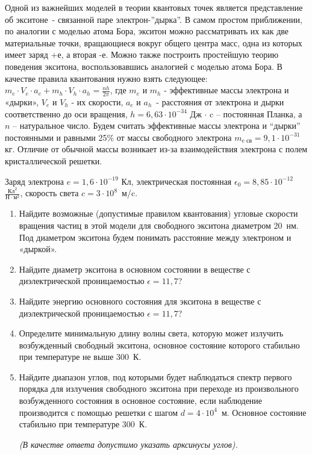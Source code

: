
Одной из важнейших моделей в теории квантовых точек является представление об экситоне~- 
связанной паре электрон-”дырка”. В самом простом приближении, по аналогии с моделью атома Бора, 
экситон можно рассматривать их как две материальные точки, вращающиеся вокруг общего центра масс, 
одна из которых имеет заряд +е, а вторая -е. Можно также построить простейшую теорию поведения экситона, 
воспользовавшись аналогией с моделью атома Бора. В качестве правила квантования нужно взять следующее: 
${m_e \cdot V_e \cdot a_e + m_h \cdot V_h \cdot a_h=\frac{nh}{2 \pi}}$, где $m_e$ и $m_h$  - эффективные массы электрона 
и «дырки», $V_e$ и $V_h$ - их скорости, $a_e$ и $a_h$~- расстояния от электрона и дырки соответственно 
до оси вращения, $h=6,63 \cdot 10^{-34}$  Дж $\cdot$ c – постоянная Планка, а $n$  – натуральное число. 
Будем считать эффективные массы электрона и “дырки” постоянными и равными 25\% от массы свободного электрона 
$m_{\text{e св}}=9,1 \cdot 10^{-31}$кг. Отличие от обычной массы возникает из-за взаимодействия электрона с полем кристаллической решетки.

Заряд электрона $e=1,6 \cdot 10^{-19}$ Кл, электрическая постоянная $\epsilon_0=8,85 \cdot 10^{-12}$  $\frac{\text{Кл}^2}{\text{Н} \cdot \text{м}^2}$, скорость 
света $c = 3 \cdot 10^8$~м/c.

\begin{enumerate}
    \item Найдите возможные (допустимые правилом квантования) угловые скорости вращения частиц в этой 
    модели для свободного экситона диаметром 20~нм. Под диаметром экситона будем понимать расстояние 
    между электроном и «дыркой».
    \item Найдите диаметр экситона в основном состоянии в веществе с диэлектрической проницаемостью $\epsilon=11,7$?
    \item Найдите энергию основного состояния для экситона в веществе с диэлектрической проницаемостью $\epsilon=11,7$?
    \item Определите минимальную длину волны света, которую может излучить возбужденный свободный экситона, основное состояние которого стабильно при температуре не выше 300~К.
    \item Найдите диапазон углов, под которыми будет наблюдаться спектр первого порядка для излучения свободного экситона при переходе из произвольного возбужденного состояния в основное состояние, если наблюдение производится с помощью решетки с шагом $d= 4 \cdot 10^4$~м. 
    Основное состояние стабильно при температуре 300~К.    

    \textit{(В качестве ответа допустимо указать арксинусы углов).}
\end{enumerate}

